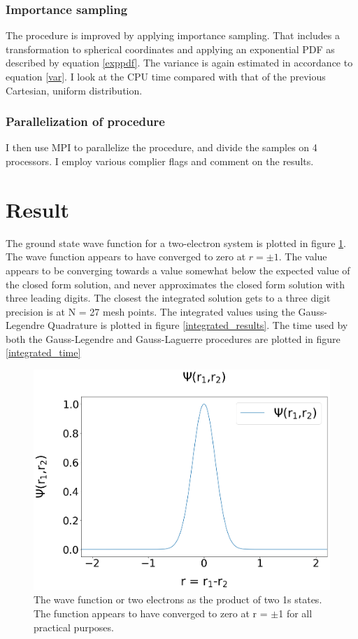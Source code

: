 \documentclass[%
reprint,
amsmath,amssymb,
aps,
]{revtex4-1}
\begin{document}
\subsubsection*{Importance sampling}\noindent 
The procedure is improved by applying importance sampling. That includes a transformation to spherical coordinates and applying an exponential PDF as described by equation \ref{exppdf}. The variance is again estimated in accordance to equation \ref{var}. I look at the CPU time compared with that of the previous Cartesian, uniform distribution.


\subsubsection*{Parallelization of procedure}
I then use MPI to parallelize the procedure, and divide the samples on 4 processors. I employ various complier flags and comment on the results.

\newpage 
\section{Result} \noindent 
The ground state wave function for a two-electron system is plotted in figure \ref{wavefigure}. The wave function appears to have converged to zero at $r = \pm 1$. The value appears to be converging towards a value somewhat below the expected value of the closed form solution, and never approximates the closed form solution with three leading digits. The closest the integrated solution gets to a three digit precision is at N = 27 mesh points. The integrated values using the Gauss-Legendre Quadrature is plotted in figure \ref{integrated_results}. The time used by both the Gauss-Legendre and Gauss-Laguerre procedures are plotted in figure \ref{integrated_time} 

\begin{figure}[!h]
	\includegraphics[scale = 0.24]{Wavefunction.png}
	\caption{\label{wavefigure} The wave function or two electrons as the product of two 1s states. The function appears to have converged to zero at r = $\pm$1 for all practical purposes.}
\end{figure}
\end{document}
